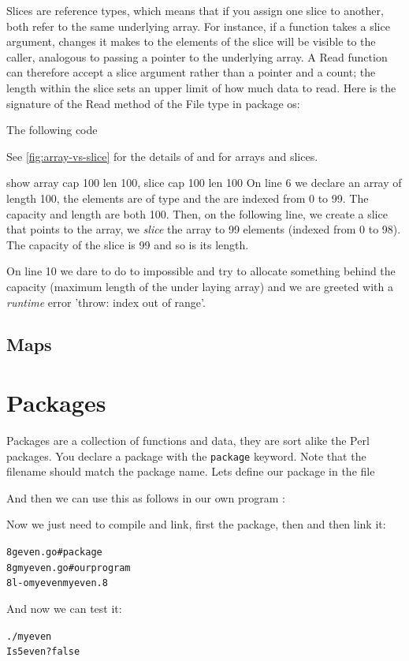 Slices are reference types, which means that if you assign one slice to
another, both refer to the same underlying array. For instance, if a
function takes a slice argument, changes it makes to the elements of the
slice will be visible to the caller, analogous to passing a pointer to
the underlying array. A Read function can therefore accept a slice
argument rather than a pointer and a count; the length within the slice
sets an upper limit of how much data to read. Here is the signature of
the Read method of the File type in package os:

The following code 


See \ref{fig:array-vs-slice} for the details of  and
 for arrays and slices.

show 
array cap 100 len 100, slice cap 100 len 100
On line 6 we declare an array of length 100, the elements are of
type  and the are indexed from 0 to 99. The capacity
and length are both 100. Then, on the following line, we create
a slice that points to the array, we \emph{slice} the array to
99 elements (indexed from 0 to 98). The capacity of the slice
is 99 and so is its length. 

On line 10 we dare to do to impossible and try to allocate something
behind the capacity (maximum length of the under laying array) and
we are greeted with a \emph{runtime} error 'throw: index out of range'.

\subsection{Maps}
\label{sec:maps}

\section{Packages}
\label{sec:packages}
Packages are a collection of functions and data, they are sort alike the
Perl packages\cite{perl-packages}. You declare a package with the
\lstinline{package} keyword. Note that the filename should
match the package name. Lets define our package  in the file


And then we can use this as follows in our own program :


Now we just need to compile and link, first the package, then  and
then link it:
\begin{alltt}
\pr 8g even.go			# package
\pr 8g myeven.go		# our program
\pr 8l -o myeven myeven.8
\end{alltt}
And now we can test it:
\begin{alltt}
\pr ./myeven
Is 5 even? false
\end{alltt}

